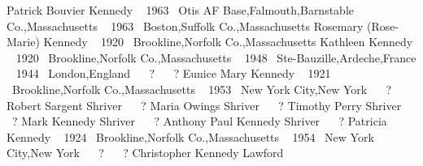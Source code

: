 {{{\descfont Patrick Bouvier Kennedy}
 \btag\ { \aug{} 1963} {\placefont \at\ }{\placefont Otis AF Base,Falmouth,Barnstable Co.,Massachusetts}
 \dtag\ { \aug{} 1963} {\placefont \at\ }{\placefont Boston,Suffolk Co.,Massachusetts}
\endsubtree 
\endsubtree 
{}%
{\descfont Rosemary (Rose-Marie) Kennedy}
 \btag\ { \feb{} 1920} {\placefont \at\ }{\placefont Brookline,Norfolk Co.,Massachusetts}
\endsubtree 
{}%
{\descfont Kathleen Kennedy}
\sepline 
{} \btag\ { \feb{} 1920} {\placefont \at\ }{\placefont Brookline,Norfolk Co.,Massachusetts}
 \dtag\ { \may{} 1948} {\placefont \at\ }{\placefont Ste-Bauzille,Ardeche,France}
 \mtag\ { \may{} 1944} {\placefont \at\ }{\placefont London,England}
 \btag\ {} {\placefont \at\ }{\placefont  ? }
 \dtag\ {} {\placefont \at\ }{\placefont  ? }
\endsubtree 
{}%
{\descfont Eunice Mary Kennedy}
\sepline 
{} \btag\ { \jul{} 1921} {\placefont \at\ }{\placefont Brookline,Norfolk Co.,Massachusetts}
 \mtag\ { \may{} 1953} {\placefont \at\ }{\placefont New York City,New York}
 \btag\ {} {\placefont \at\ }{\placefont  ? }
% 
{\descfont Robert Sargent Shriver}
 \btag\ {} {\placefont \at\ }{\placefont  ? }
\endsubtree 
{}%
{\descfont Maria Owings Shriver}
 \btag\ {} {\placefont \at\ }{\placefont  ? }
\endsubtree 
{}%
{\descfont Timothy Perry Shriver}
 \btag\ {} {\placefont \at\ }{\placefont  ? }
\endsubtree 
{}%
{\descfont Mark Kennedy Shriver}
 \btag\ {} {\placefont \at\ }{\placefont  ? }
\endsubtree 
{}%
{\descfont Anthony Paul Kennedy Shriver}
 \btag\ {} {\placefont \at\ }{\placefont  ? }
\endsubtree 
\endsubtree 
{}%
{\descfont Patricia Kennedy}
\sepline 
{} \btag\ { \may{} 1924} {\placefont \at\ }{\placefont Brookline,Norfolk Co.,Massachusetts}
 \mtag\ { \apr{} 1954} {\placefont \at\ }{\placefont New York City,New York}
 \btag\ {} {\placefont \at\ }{\placefont  ? }
 \dtag\ {} {\placefont \at\ }{\placefont  ? }
% 
{\descfont Christopher Kennedy Lawford}
}}
